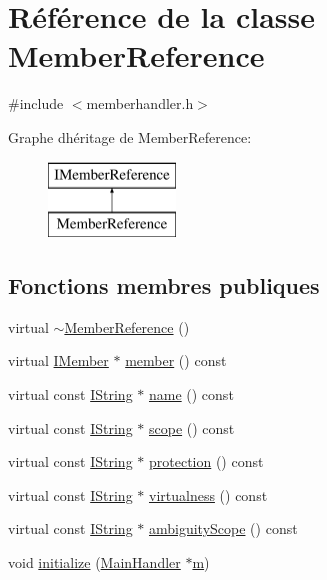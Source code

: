 \hypertarget{class_member_reference}{}\section{Référence de la classe Member\+Reference}
\label{class_member_reference}


{\ttfamily \#include $<$memberhandler.\+h$>$}

Graphe d\textquotesingle{}héritage de Member\+Reference\+:\begin{figure}[H]
\begin{center}
\leavevmode
\includegraphics[height=2.000000cm]{class_member_reference}
\end{center}
\end{figure}
\subsection*{Fonctions membres publiques}
\begin{DoxyCompactItemize}
\item 
virtual \hyperlink{class_member_reference_a78628ad84d5045fbf7dcfc39063ef386}{$\sim$\+Member\+Reference} ()
\item 
virtual \hyperlink{class_i_member}{I\+Member} $\ast$ \hyperlink{class_member_reference_aec103a5d11c9d6116a88814842c1abc9}{member} () const 
\item 
virtual const \hyperlink{class_i_string}{I\+String} $\ast$ \hyperlink{class_member_reference_acf90ffa4c394a52bb560d0718fa1728a}{name} () const 
\item 
virtual const \hyperlink{class_i_string}{I\+String} $\ast$ \hyperlink{class_member_reference_aa1e4b25993f635eea2cc5bad403f0ed3}{scope} () const 
\item 
virtual const \hyperlink{class_i_string}{I\+String} $\ast$ \hyperlink{class_member_reference_a8b429d8771ce6cb3ff84297aeff2beba}{protection} () const 
\item 
virtual const \hyperlink{class_i_string}{I\+String} $\ast$ \hyperlink{class_member_reference_ae84cf19af62ffd5631f07c534cda2d77}{virtualness} () const 
\item 
virtual const \hyperlink{class_i_string}{I\+String} $\ast$ \hyperlink{class_member_reference_ae636b0c1f79895c4d2f445b400789677}{ambiguity\+Scope} () const 
\item 
void \hyperlink{class_member_reference_ac82f336309ab47218a87fec5ea8fc68c}{initialize} (\hyperlink{class_main_handler}{Main\+Handler} $\ast$\hyperlink{060__command__switch_8tcl_a78d127e8bda64d4471ac811ad512fbd9}{m})
\end{DoxyCompactItemize}
